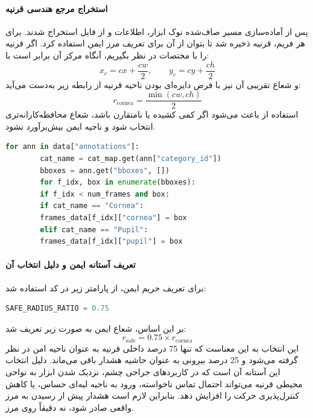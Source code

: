 \documentclass{article}
\begin{document}
\paragraph{استخراج مرجع هندسی قرنیه}
پس از آماده‌سازی مسیر صاف‌شده نوک ابزار، اطلاعات  و  از فایل  استخراج شدند. برای هر فریم،  قرنیه ذخیره شد تا بتوان از آن برای تعریف مرز ایمن استفاده کرد. اگر  قرنیه را با مختصات  در نظر بگیریم، آنگاه مرکز آن برابر است با:
\[
x_c = cx + \frac{cw}{2}, \qquad
y_c = cy + \frac{ch}{2}
\]
و شعاع تقریبی آن نیز با فرض دایره‌ای بودن ناحیه قرنیه از رابطه زیر به‌دست می‌آید:
\[
r_{\text{cornea}} = \frac{\min(cw, ch)}{2}
\]
استفاده از  باعث می‌شود اگر  کمی کشیده یا نامتقارن باشد، شعاع محافظه‌کارانه‌تری انتخاب شود و ناحیه ایمن بیش‌برآورد نشود.


\begin{latin}
	\begin{lstlisting}[language=Python, basicstyle=\ttfamily\scriptsize]
		for ann in data["annotations"]:
		cat_name = cat_map.get(ann["category_id"])
		bboxes = ann.get("bboxes", [])
		for f_idx, box in enumerate(bboxes):
		if f_idx < num_frames and box:
		if cat_name == "Cornea":
		frames_data[f_idx]["cornea"] = box
		elif cat_name == "Pupil":
		frames_data[f_idx]["pupil"] = box
	\end{lstlisting}
\end{latin}

\paragraph{تعریف آستانه ایمن و دلیل انتخاب آن}
برای تعریف حریم ایمن، از پارامتر زیر در کد استفاده شد:

\begin{latin}
	\begin{lstlisting}[language=Python, basicstyle=\ttfamily\scriptsize]
		SAFE_RADIUS_RATIO = 0.75
	\end{lstlisting}
\end{latin}
بر این اساس، شعاع ایمن به صورت زیر تعریف شد:
\[
r_{\text{safe}} = 0.75 \times r_{\text{cornea}}
\]
این انتخاب به این معناست که تنها 75 درصد داخلی قرنیه به عنوان ناحیه امن در نظر گرفته می‌شود و 25 درصد بیرونی به عنوان حاشیه هشدار باقی می‌ماند. دلیل انتخاب این آستانه آن است که در کاربردهای جراحی چشم، نزدیک شدن ابزار به نواحی محیطی قرنیه می‌تواند احتمال تماس ناخواسته، ورود به ناحیه لبه‌ای حساس، یا کاهش کنترل‌پذیری حرکت را افزایش دهد. بنابراین لازم است هشدار پیش از رسیدن به مرز واقعی صادر شود، نه دقیقاً روی مرز.
\end{document}
